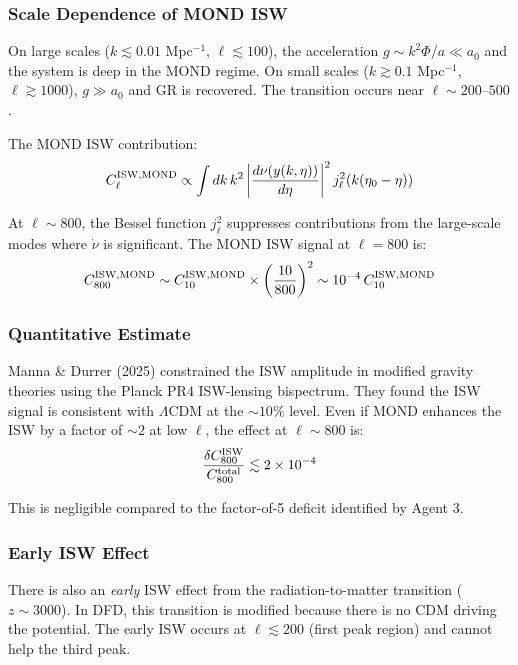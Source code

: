 \documentclass[11pt,a4paper]{article}
\begin{document}
\subsubsection{Scale Dependence of MOND ISW}

On large scales ($k \lesssim 0.01$ Mpc$^{-1}$, $\ell \lesssim 100$), the acceleration $g \sim k^2\Phi/a \ll a_0$ and the system is deep in the MOND regime. On small scales ($k \gtrsim 0.1$ Mpc$^{-1}$, $\ell \gtrsim 1000$), $g \gg a_0$ and GR is recovered. The transition occurs near $\ell \sim 200$--$500$.

The MOND ISW contribution:
\begin{equation}
C_\ell^{\rm ISW, MOND} \propto \int dk\,k^2\left|\frac{d\nu(y(k,\eta))}{d\eta}\right|^2 j_\ell^2(k(\eta_0 - \eta))
\end{equation}

At $\ell \sim 800$, the Bessel function $j_\ell^2$ suppresses contributions from the large-scale modes where $\dot{\nu}$ is significant. The MOND ISW signal at $\ell = 800$ is:
\begin{equation}
C_{800}^{\rm ISW,MOND} \sim C_{10}^{\rm ISW,MOND} \times \left(\frac{10}{800}\right)^2 \sim 10^{-4}\,C_{10}^{\rm ISW,MOND}
\end{equation}

\subsubsection{Quantitative Estimate}

Manna \& Durrer (2025) constrained the ISW amplitude in modified gravity theories using the Planck PR4 ISW-lensing bispectrum. They found the ISW signal is consistent with $\Lambda$CDM at the $\sim 10\%$ level. Even if MOND enhances the ISW by a factor of $\sim 2$ at low $\ell$, the effect at $\ell \sim 800$ is:
\begin{equation}
\frac{\delta C_{800}^{\rm ISW}}{C_{800}^{\rm total}} \lesssim 2 \times 10^{-4}
\end{equation}

This is negligible compared to the factor-of-5 deficit identified by Agent 3.

\subsubsection{Early ISW Effect}

There is also an \emph{early} ISW effect from the radiation-to-matter transition ($z \sim 3000$). In DFD, this transition is modified because there is no CDM driving the potential. The early ISW occurs at $\ell \lesssim 200$ (first peak region) and cannot help the third peak.
\end{document}
